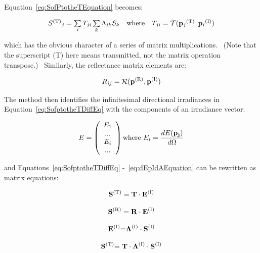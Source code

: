 Equation~\ref{eq:SofPtotheTEquation} becomes:

\begin{equation}
\begin{array}{*{20}{c}}{{S^{{\rm{(T)}}}}_j = \sum\limits_i {{T_{ji}}} \sum\limits_k {{\Lambda_{ik}}} {S_k}}&{{\rm{where}}}&{{T_{ji}} = {\mathcal{T}} ({{\bf{p}}_j}^{{\rm{(T)}}},{{\bf{p}}_i}^{{\rm{(I)}}})}\end{array}
\end{equation}

which has the obvious character of a series of matrix multiplications.~ (Note that the superscript (T) here means transmitted, not the matrix operation transpose.)~ Similarly, the reflectance matrix elements are:

\begin{equation}
{R_{ij}} = {\mathcal{R}} ({{\bf{p}}^{{\rm{(R)}}}},{{\bf{p}}^{{\rm{(I)}}}})
\label{eq:RijEquation}
\end{equation}

The method then identifies the infinitesimal directional irradiances in Equation~\ref{eq:SofptotheTDiffEq} with the components of an irradiance vector:

\begin{equation}
E = \left(
    \begin{array}{c}
      E_1 \\ ... \\ E_i \\ ...
    \end{array}
  \right)
  \text{where}
  ~E_i = \frac{dE(\bf{p}_j)}{d\Omega}
\end{equation}

and Equations~\ref{eq:SofptotheTDiffEq} -~\ref{eq:dEpIdAEquation} can be rewritten as matrix equations:

\begin{equation}
{{\bf{S}}^{{\rm{(T)}}}} = {\bf{T}} \cdot {{\bf{E}}^{{\rm{(I)}}}}
\end{equation}

\begin{equation}
{{\bf{S}}^{{\rm{(R)}}}} = {\bf{R}} \cdot {{\bf{E}}^{{\rm{(I)}}}}
\end{equation}

\begin{equation}
{{\bf{E}}^{{\rm{(I)}}}}{\bf{ = }}{\bf{\Lambda }^{{\rm{(I)}}}} \cdot {{\bf{S}}^{{\rm{(I)}}}}
\end{equation}

\begin{equation}
{{\bf{S}}^{{\rm{(T)}}}}{\bf{ = T}} \cdot {\bf{\Lambda }^{{\rm{(I)}}}} \cdot {{\bf{S}}^{{\rm{(I)}}}}
\end{equation}

